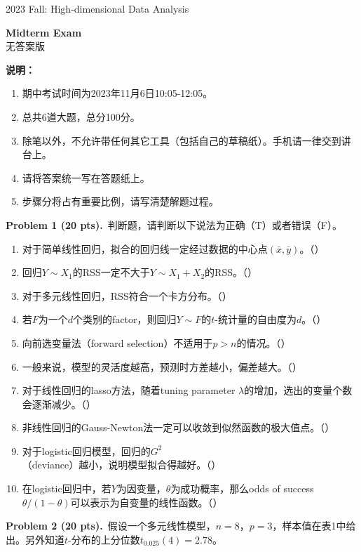 \documentclass[UTF8,a4paper,11pt,fontset=fandol]{ctexart}
\newcommand{\blank}{\mbox{（\hspace{1.5em}）}}
\newcommand{\problem}[2]{\par\addvspace{10pt}\Needspace{5\baselineskip}\textbf{Problem #1 (#2 pts).}\ }
\newcommand{\examheader}[2]{%
  {\large #1 Fall: High-dimensional Data Analysis}\par
  \vspace{6pt}
  \begin{center}{\Large\bfseries #2}\\[3pt]{\small 无答案版}\end{center}
  \vspace{2pt}}
\begin{document}
\examheader{2023}{Midterm Exam}
\textbf{说明：}
\begin{enumerate}[label=\arabic*.,itemsep=3pt]
  \item 期中考试时间为2023年11月6日10:05-12:05。
  \item 总共6道大题，总分100分。
  \item 除笔以外，不允许带任何其它工具（包括自己的草稿纸）。手机请一律交到讲台上。
  \item 请将答案统一写在答题纸上。
  \item 步骤分将占有重要比例，请写清楚解题过程。
\end{enumerate}

\problem{1}{20}判断题，请判断以下说法为正确（T）或者错误（F）。
\begin{enumerate}
  \item 对于简单线性回归，拟合的回归线一定经过数据的中心点$(\bar x,\bar y)$。\blank
  \item 回归$Y\sim X_1$的RSS一定不大于$Y\sim X_1+X_2$的RSS。\blank
  \item 对于多元线性回归，RSS符合一个卡方分布。\blank
  \item 若$F$为一个$d$个类别的factor，则回归$Y\sim F$的$t$-统计量的自由度为$d$。\blank
  \item 向前选变量法（forward selection）不适用于$p>n$的情况。\blank
  \item 一般来说，模型的灵活度越高，预测时方差越小，偏差越大。\blank
  \item 对于线性回归的lasso方法，随着tuning parameter $\lambda$的增加，选出的变量个数会逐渐减少。\blank
  \item 非线性回归的Gauss-Newton法一定可以收敛到似然函数的极大值点。\blank
  \item 对于logistic回归模型，回归的$G^2$（deviance）越小，说明模型拟合得越好。\blank
  \item 在logistic回归中，若$Y$为因变量，$\theta$为成功概率，那么odds of success $\theta/(1-\theta)$可以表示为自变量的线性函数。\blank
\end{enumerate}

\newpage
\problem{2}{20}假设一个多元线性模型，$n=8$，$p=3$，样本值在表1中给出。另外知道$t$-分布的上分位数$t_{0.025}(4)=2.78$。
\end{document}
